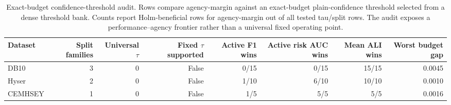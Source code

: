 \begin{table}[!t]
\centering
\caption{Exact-budget confidence-threshold audit. Rows compare agency-margin against an exact-budget plain-confidence threshold selected from a dense threshold bank. Counts report Holm-beneficial rows for agency-margin out of all tested tau/split rows. The audit exposes a performance--agency frontier rather than a universal fixed operating point.}
\label{tab:exact-budget}
\footnotesize
\begin{tabular}{lrrrrrrr}
\toprule
Dataset & Split families & Universal $\tau$ & Fixed $\tau$ supported & Active F1 wins & Active risk AUC wins & Mean ALI wins & Worst budget gap \\
\midrule
DB10 & 3 & 0 & False & 0/15 & 0/15 & 15/15 & 0.0045 \\
Hyser & 2 & 0 & False & 1/10 & 6/10 & 10/10 & 0.0010 \\
CEMHSEY & 1 & 0 & False & 1/5 & 5/5 & 5/5 & 0.0016 \\
\bottomrule
\end{tabular}
\end{table}

